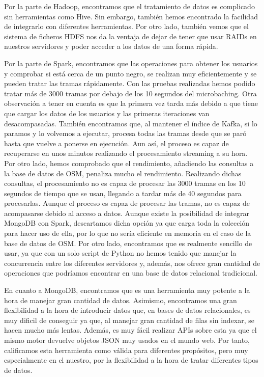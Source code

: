 Por la parte de Hadoop, encontramos que el tratamiento de datos es complicado sin herramientas como Hive. Sin embargo, también hemos encontrado la facilidad de integrarlo con diferentes herramientas. Por otro lado, también vemos que el sistema de ficheros HDFS nos da la ventaja de dejar de tener que usar RAIDs en nuestros servidores y poder acceder a los datos de una forma rápida.\par

Por la parte de Spark, encontramos que las operaciones para obtener los usuarios y comprobar si está cerca de un punto negro, se realizan muy eficientemente y se pueden tratar las tramas rápidamente. Con las pruebas realizadas hemos podido tratar más de 3000 tramas por debajo de los 10 segundos del microbaching. Otra observación a tener en cuenta es que la primera vez tarda más debido a que tiene que cargar los datos de los usuarios y las primeras iteraciones van desacompasadas. También encontramos que, al mantener el índice de Kafka, si lo paramos y lo volvemos a ejecutar, procesa todas las tramas desde que se paró hasta que vuelve a ponerse en ejecución. Aun así, el proceso es capaz de recuperarse en unos minutos realizando el procesamiento streaming a su hora. Por otro lado, hemos comprobado que el rendimiento, añadiendo las consultas a la base de datos de OSM, penaliza mucho el rendimiento. Realizando dichas consultas, el procesamiento no es capaz de procesar las 3000 tramas en los 10 segundos de tiempo que se usan, llegando a tardar más de 40 segundos para procesarlas. Aunque el proceso es capaz de procesar las tramas, no es capaz de acompasarse debido al acceso a datos. Aunque existe la posibilidad de integrar MongoDB con Spark, descartamos dicha opción ya que carga toda la colección para hacer uso de ella, por lo que no sería eficiente en memoria en el caso de la base de datos de OSM. Por otro lado, encontramos que es realmente sencillo de usar, ya que con un solo script de Python no hemos tenido que manejar la concurrencia entre los diferentes servidores y, además, nos ofrece gran cantidad de operaciones que podríamos encontrar en una base de datos relacional tradicional. \par

En cuanto a MongoDB, encontramos que es una herramienta muy potente a la hora de manejar gran cantidad de datos. Asimismo, encontramos una gran flexibilidad a la hora de introducir datos que, en bases de datos relacionales, es muy dificil de conseguir ya que, al manejar gran cantidad de filas sin indexar, se hacen mucho más lentas. Además, es muy fácil realizar APIs sobre esta ya que el mismo motor devuelve objetos JSON muy usados en el mundo web. Por tanto, calificamos esta herramienta como válida para diferentes propósitos, pero muy especialmente en el nuestro, por la flexibilidad a la hora de tratar diferentes tipos de datos.\par


